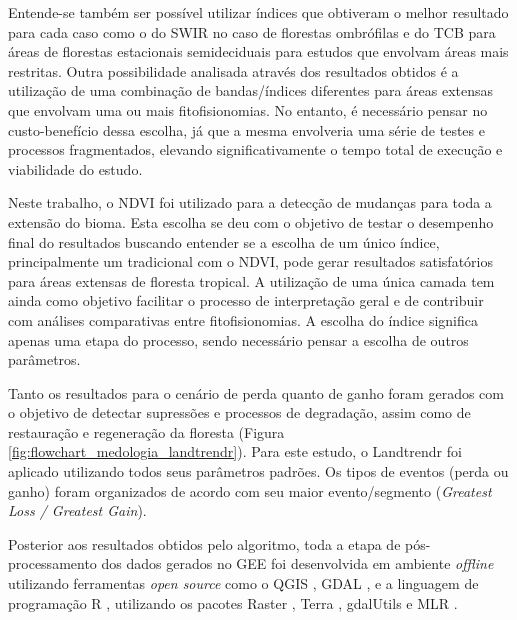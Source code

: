 Entende-se também ser possível utilizar índices que obtiveram o melhor resultado para cada caso como o do SWIR no caso de florestas ombrófilas e do TCB para áreas de florestas estacionais semideciduais para estudos que envolvam áreas mais restritas. Outra possibilidade analisada através dos resultados obtidos é a utilização de uma combinação de bandas/índices diferentes para áreas extensas que envolvam uma ou mais fitofisionomias. No entanto, é necessário pensar no custo-benefício dessa escolha, já que a mesma envolveria uma série de testes e processos fragmentados, elevando significativamente o tempo total de execução e viabilidade do estudo. 

Neste trabalho, o NDVI foi utilizado para a detecção de mudanças para toda a extensão do bioma. Esta escolha se deu com o objetivo de testar o desempenho final do resultados buscando entender se a escolha de um único índice, principalmente um tradicional com o NDVI, pode gerar resultados satisfatórios para áreas extensas de floresta tropical. A utilização de uma única camada tem ainda como objetivo facilitar o processo de interpretação geral e de contribuir com análises comparativas entre fitofisionomias. A escolha do índice significa apenas uma etapa do processo, sendo necessário pensar a escolha de outros parâmetros.

Tanto os resultados para o cenário de perda quanto de ganho foram gerados com o objetivo de detectar supressões e processos de degradação, assim como de restauração e regeneração da floresta (Figura \ref{fig:flowchart_medologia_landtrendr}). Para este estudo, o Landtrendr foi aplicado utilizando todos seus parâmetros padrões. Os tipos de eventos (perda ou ganho) foram organizados de acordo com seu maior evento/segmento (\textit{Greatest Loss / Greatest Gain}).

Posterior aos resultados obtidos pelo algoritmo, toda a etapa de pós-processamento dos dados gerados no GEE foi desenvolvida em ambiente \textit{offline} utilizando ferramentas \textit{open source} como o QGIS \citep{QGIS_software}, GDAL \citep{gdal}, e a linguagem de programação R \citep{Rsoftware}, utilizando os pacotes Raster \citep{raster}, Terra \cite{terra}, gdalUtils \citep{gdalutils} e MLR \citep{mlr}.

